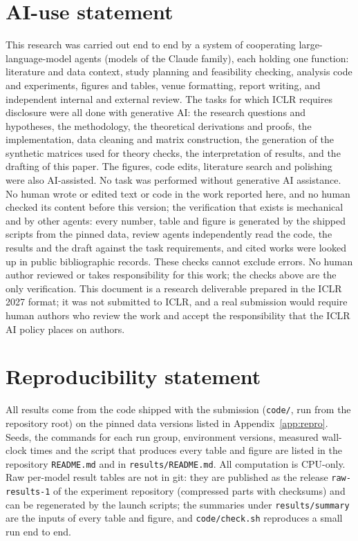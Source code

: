\section*{AI-use statement}
This research was carried out end to end by a system of cooperating large-language-model agents (models of the Claude family), each holding one function: literature and data context, study planning and feasibility checking, analysis code and experiments, figures and tables, venue formatting, report writing, and independent internal and external review. The tasks for which ICLR requires disclosure were all done with generative AI: the research questions and hypotheses, the methodology, the theoretical derivations and proofs, the implementation, data cleaning and matrix construction, the generation of the synthetic matrices used for theory checks, the interpretation of results, and the drafting of this paper. The figures, code edits, literature search and polishing were also AI-assisted. No task was performed without generative AI assistance. No human wrote or edited text or code in the work reported here, and no human checked its content before this version; the verification that exists is mechanical and by other agents: every number, table and figure is generated by the shipped scripts from the pinned data, review agents independently read the code, the results and the draft against the task requirements, and cited works were looked up in public bibliographic records. These checks cannot exclude errors. No human author reviewed or takes responsibility for this work; the checks above are the only verification. This document is a research deliverable prepared in the ICLR 2027 format; it was not submitted to ICLR, and a real submission would require human authors who review the work and accept the responsibility that the ICLR AI policy places on authors.

\section*{Reproducibility statement}
All results come from the code shipped with the submission (\texttt{code/}, run from the repository root) on the pinned data versions listed in Appendix~\ref{app:repro}. Seeds, the commands for each run group, environment versions, measured wall-clock times and the script that produces every table and figure are listed in the repository \texttt{README.md} and in \texttt{results/README.md}. All computation is CPU-only. Raw per-model result tables are not in git: they are published as the release \texttt{raw-results-1} of the experiment repository (compressed parts with checksums) and can be regenerated by the launch scripts; the summaries under \texttt{results/summary} are the inputs of every table and figure, and \texttt{code/check.sh} reproduces a small run end to end.

